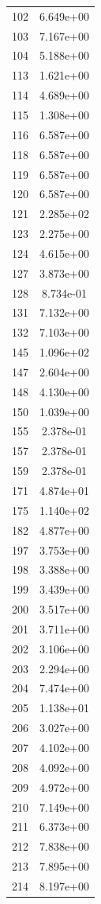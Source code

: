 \documentclass[12pt]{article}
\begin{document}
\begin{longtable}{@{}cc@{}}
102 & 6.649e+00 \\
103 & 7.167e+00 \\
104 & 5.188e+00 \\
113 & 1.621e+00 \\
114 & 4.689e+00 \\
115 & 1.308e+00 \\
116 & 6.587e+00 \\
118 & 6.587e+00 \\
119 & 6.587e+00 \\
120 & 6.587e+00 \\
121 & 2.285e+02 \\
123 & 2.275e+00 \\
124 & 4.615e+00 \\
127 & 3.873e+00 \\
128 & 8.734e-01 \\
131 & 7.132e+00 \\
132 & 7.103e+00 \\
145 & 1.096e+02 \\
147 & 2.604e+00 \\
148 & 4.130e+00 \\
150 & 1.039e+00 \\
155 & 2.378e-01 \\
157 & 2.378e-01 \\
159 & 2.378e-01 \\
171 & 4.874e+01 \\
175 & 1.140e+02 \\
182 & 4.877e+00 \\
197 & 3.753e+00 \\
198 & 3.388e+00 \\
199 & 3.439e+00 \\
200 & 3.517e+00 \\
201 & 3.711e+00 \\
202 & 3.106e+00 \\
203 & 2.294e+00 \\
204 & 7.474e+00 \\
205 & 1.138e+01 \\
206 & 3.027e+00 \\
207 & 4.102e+00 \\
208 & 4.092e+00 \\
209 & 4.972e+00 \\
210 & 7.149e+00 \\
211 & 6.373e+00 \\
212 & 7.838e+00 \\
213 & 7.895e+00 \\
214 & 8.197e+00 \\

\end{longtable}
\end{document}
